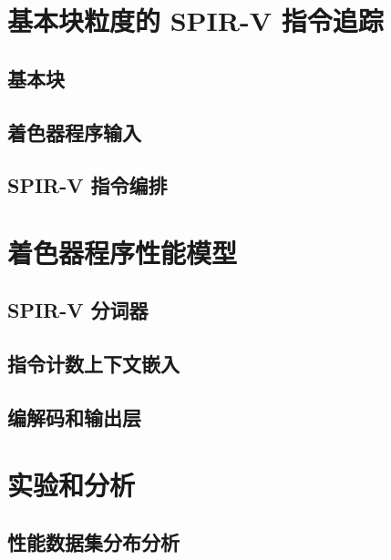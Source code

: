 
\section{基本块粒度的 SPIR-V 指令追踪}

\label{sec:tracing}

\subsection{基本块}

\subsection{着色器程序输入}

\subsection{SPIR-V 指令编排}

\section{着色器程序性能模型}

\label{sec:model}

\subsection{SPIR-V 分词器}

\subsection{指令计数上下文嵌入}

\subsection{编解码和输出层}

\section{实验和分析}

\subsection{性能数据集分布分析}


